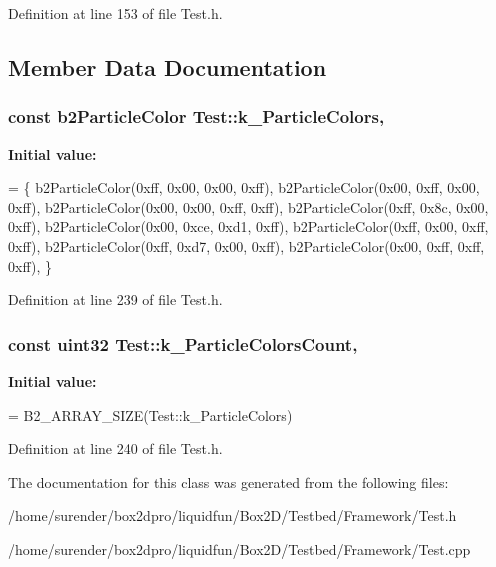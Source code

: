 Definition at line 153 of file Test.\-h.



\subsection{Member Data Documentation}
\hypertarget{classTest_a5f7b918b848f2bb7c71d883941c502a6}{
\subsubsection[{k\-\_\-\-Particle\-Colors}]{\setlength{\rightskip}{0pt plus 5cm}const b2\-Particle\-Color Test\-::k\-\_\-\-Particle\-Colors\hspace{0.3cm}{\ttfamily [static]}, {\ttfamily [protected]}}}\label{classTest_a5f7b918b848f2bb7c71d883941c502a6}
{\bfseries Initial value\-:}
\begin{DoxyCode}
= \{
    b2ParticleColor(0xff, 0x00, 0x00, 0xff), 
    b2ParticleColor(0x00, 0xff, 0x00, 0xff), 
    b2ParticleColor(0x00, 0x00, 0xff, 0xff), 
    b2ParticleColor(0xff, 0x8c, 0x00, 0xff), 
    b2ParticleColor(0x00, 0xce, 0xd1, 0xff), 
    b2ParticleColor(0xff, 0x00, 0xff, 0xff), 
    b2ParticleColor(0xff, 0xd7, 0x00, 0xff), 
    b2ParticleColor(0x00, 0xff, 0xff, 0xff), 
\}
\end{DoxyCode}


Definition at line 239 of file Test.\-h.

\hypertarget{classTest_acc208d39dcfdb3198383eed90a419a12}{
\subsubsection[{k\-\_\-\-Particle\-Colors\-Count}]{\setlength{\rightskip}{0pt plus 5cm}const uint32 Test\-::k\-\_\-\-Particle\-Colors\-Count\hspace{0.3cm}{\ttfamily [static]}, {\ttfamily [protected]}}}\label{classTest_acc208d39dcfdb3198383eed90a419a12}
{\bfseries Initial value\-:}
\begin{DoxyCode}
=
    B2\_ARRAY\_SIZE(Test::k\_ParticleColors)
\end{DoxyCode}


Definition at line 240 of file Test.\-h.



The documentation for this class was generated from the following files\-:\begin{DoxyCompactItemize}
\item 
/home/surender/box2dpro/liquidfun/\-Box2\-D/\-Testbed/\-Framework/Test.\-h\item 
/home/surender/box2dpro/liquidfun/\-Box2\-D/\-Testbed/\-Framework/Test.\-cpp\end{DoxyCompactItemize}
